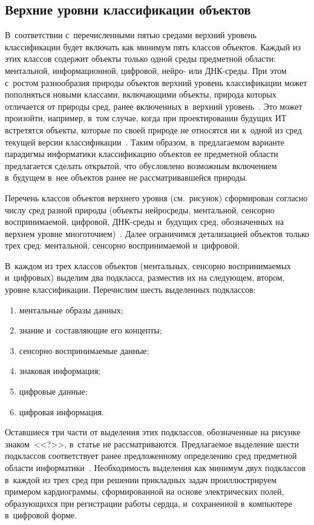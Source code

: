 \begin{multicols}{2}
\vspace*{-6pt}

\section{Верхние уровни классификации объектов}

\vspace*{-3pt}

    В~соответствии с~перечисленными пятью средами верхний уровень 
классификации будет включать как минимум пять классов объектов. Каждый 
из этих классов содержит объекты только одной среды предметной области: 
ментальной, информационной, цифровой, нейро- или ДНК-сре\-ды. При этом 
с~ростом разнообразия природы объектов верхний уровень классификации 
может пополняться новыми классами, включающими объекты, природа 
которых отличается от природы сред, ранее включенных в~верхний  
уровень~\cite{26-zac}. Это может произойти, например, в~том случае, когда при 
проектировании будущих ИТ встретятся объекты, которые по своей природе не 
относятся ни к~одной из сред текущей версии классификации~\cite{28-zac}. 
Таким образом, в~предлагаемом варианте парадигмы информатики 
классификацию объектов ее предметной области предлагается сделать 
открытой, что обусловлено возможным включением в~будущем в~нее объектов 
ранее не рассматривавшейся природы.
    
Перечень классов объектов верхнего уровня (см.\ рисунок) 
сформирован согласно чис\-лу сред раз\-ной природы (объекты ней\-ро\-сре\-ды, 
ментальной, сенсорно вос\-при\-ни\-ма\-емой, циф\-ро\-вой, ДНК-сре\-ды и~будущих 
сред, обозначенных на верх\-нем уровне многоточием)~\cite{25-zac}. Далее 
ограничимся детализацией объектов только трех сред: ментальной, сенсорно 
вос\-при\-ни\-ма\-емой и~циф\-ро\-вой. 
    
   
     
    В~каждом из трех классов объектов (ментальных, сенсорно 
воспринимаемых и~цифровых) выделим два подкласса, разместив их на 
следующем, втором, уровне классификации. Перечислим шесть выделенных 
подклассов: 
\begin{enumerate}[(1)]
\item ментальные образы данных; 
\item знание и~составляющие его 
концепты; 
\item сенсорно воспринимаемые данные; 
\item знаковая информация;
\item цифровые данные;
\item цифровая информация.
\end{enumerate}
 Оставшиеся три части от 
выделения этих подклассов, обозначенные на рисунке знаком~<<?>>, в~статье 
не рассматриваются. Предлагаемое выделение шес\-ти подклассов соответствует 
ранее предложенному определению сред предметной области 
информатики~\cite{25-zac}. Необходимость выделения как минимум двух 
подклассов в~каждой из трех сред при решении прикладных задач 
проиллюстрируем примером кардиограммы, сформированной на основе 
электрических полей, образующихся при регистрации работы сердца, 
и~сохраненной в~компьютере в~цифровой форме.
    

\end{multicols}
